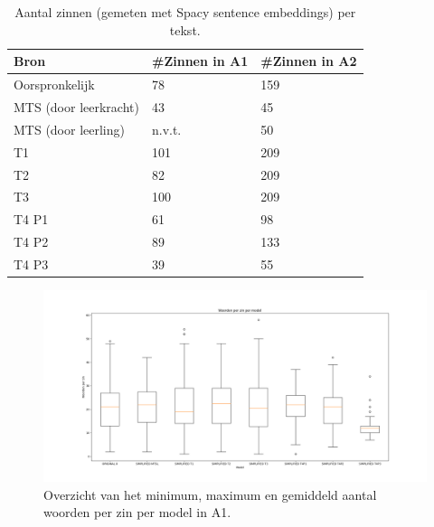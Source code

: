 \chapter{}%
\label{ch:afbeeldingen-resultaten-verg-studie}


\begin{table}[h]
	\centering
	\begin{tabular}{ | m{3cm} | m{3cm} | m{3cm} | } 
		\hline
		Bron & #Zinnen in A1 & #Zinnen in A2 \\
		\hline
		Oorspronkelijk & 78  & 159 \\ 
		\hline
		MTS (door leerkracht) & 43 & 45 \\
		\hline
		MTS (door leerling) & n.v.t. & 50 \\
		\hline
		T1 & 101 & 209 \\
		\hline
		T2 & 82 & 209 \\
		\hline
		T3 & 100 & 209 \\
		\hline
		T4 P1 & 61 & 98 \\
		\hline
		T4 P2 & 89 & 133 \\
		\hline
		T4 P3 & 39 & 55 \\
		\hline
	\end{tabular}
	\label{table:resultaten-aantal-zinnen}
	\caption{Aantal zinnen (gemeten met Spacy sentence embeddings) per tekst.}
\end{table}


\begin{figure}
	\includegraphics[width=\linewidth]{img/boxplot-avg-a1.png}
	\caption{Overzicht van het minimum, maximum en gemiddeld aantal woorden per zin per model in A1.}
	\label{img:boxplot-min-max-avg-words-a1}
\end{figure}

